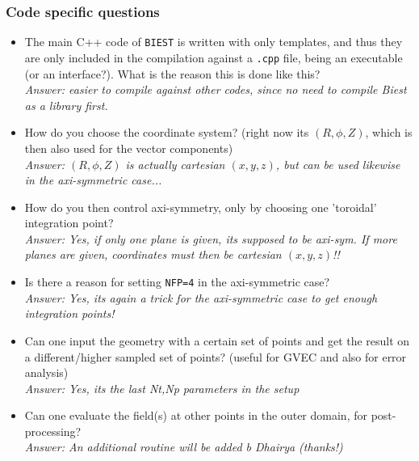 \documentclass[aspectratio=169]{beamer}
\begin{document}
\begin{frame}
  \frametitle{Code specific questions} 
  \small
   
\begin{itemize}
  \item The main C++ code of \texttt{BIEST} is written with only templates, and thus they are only included in the compilation against a \texttt{.cpp} file, being an executable (or an interface?). What is the reason this is done like this? \\
  \textit{\tiny Answer: easier to compile against other codes, since no need to compile Biest as a library first.}
  \item How do you choose the coordinate system? (right now its $(R,\phi,Z)$, which is then also used for the vector components)\\
  \textit{\tiny Answer: $(R,\phi,Z)$ is actually cartesian $(x,y,z)$, but can be used likewise in the axi-symmetric case...}
  \item How do you then control axi-symmetry, only by choosing one 'toroidal' integration point?\\
  \textit{\tiny Answer: Yes, if only one plane is given, its supposed to be axi-sym. If more planes are given, coordinates must then be cartesian $(x,y,z)$!!}
  \item Is there a reason for setting \texttt{NFP=4} in the axi-symmetric case?\\
  \textit{\tiny Answer: Yes, its again a trick for the axi-symmetric case to get enough integration points!}
  \item Can one input the geometry with a certain set of points and get the result on a different/higher sampled set of points? (useful for GVEC and also for error analysis)\\
  \textit{\tiny Answer: Yes, its the last Nt,Np parameters in the setup}
   \item Can one evaluate the field(s) at other points in the outer domain, for post-processing?\\
   \textit{\tiny Answer: An additional routine will be added b Dhairya (thanks!)}
\end{itemize}
   
\end{frame}
\end{document}
